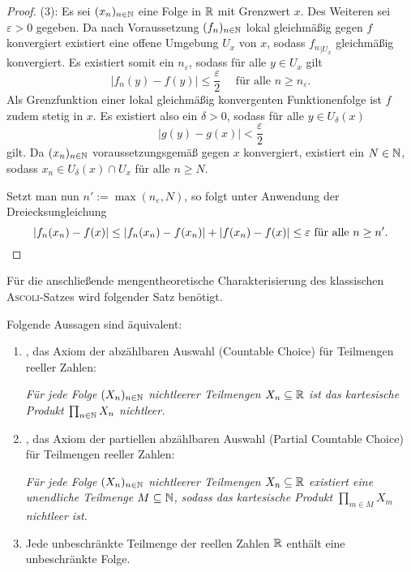 \begin{proof}
  (3): 
  Es sei $(x_n)_{n \in \mathbb{N}}$ eine Folge in $\mathbb{R}$ mit Grenzwert $x$.
  Des Weiteren sei $\varepsilon > 0$ gegeben.
  Da nach Voraussetzung $(f_n)_{n \in \mathbb{N}}$ lokal gleichmäßig gegen $f$ konvergiert existiert eine offene Umgebung $U_x$ von $x$, sodass ${f_n}_{| U_x}$ gleichmäßig konvergiert.
  Es existiert somit ein $n_\varepsilon$, sodass für alle $y \in U_x$ gilt 
  \begin{displaymath}
    | f_n(y) - f(y) | \leq \frac{\varepsilon}{2} \quad \text{ für alle $n \geq n_\varepsilon$}.
  \end{displaymath}
  Als Grenzfunktion einer lokal gleichmäßig konvergenten Funktionenfolge ist $f$ zudem stetig in $x$.
  Es existiert also ein $\delta > 0$, sodass für alle $y \in U_\delta(x)$
  \begin{displaymath}
    | g(y) - g(x) | < \frac{\varepsilon}{2}
  \end{displaymath}
  gilt.
  Da $(x_n)_{n \in \mathbb{N}}$ voraussetzungsgemäß gegen $x$ konvergiert, existiert ein $N \in \mathbb{N}$, sodass $x_n \in U_\delta(x) \cap U_x$ für alle $n \geq N$.

  Setzt man nun $n':= \max(n_\varepsilon, N)$, so folgt unter Anwendung der Dreiecksungleichung
  \begin{displaymath}
    | f_n(x_n) - f(x) |
    \leq
    | f_n(x_n) - f(x_n) | + | f(x_n) - f(x) | 
    \leq \varepsilon \text{ für alle $n \geq n'$}. \qedhere
  \end{displaymath}
\end{proof}

Für die anschließende mengentheoretische Charakterisierung des klassischen \textsc{Ascoli}\hyp{}Satzes wird folgender Satz benötigt.

\begin{thm}
  \label{thm:unboundedsubsetofR}
  Folgende Aussagen sind äquivalent:
  \begin{enumerate}[(1)]
    \item \CCR, das Axiom der abzählbaren Auswahl (Countable Choice) für Teilmengen reeller Zahlen:
      \begin{addmargin}[2em]{2em}%
        \textit{Für jede Folge $(X_n)_{n \in \mathbb{N}}$ nichtleerer Teilmengen $X_n \subseteq \mathbb{R}$ ist das kartesische Produkt $\prod_{n \in \mathbb{N}} X_n$ nichtleer.}
      \end{addmargin}
    \item \PCCR, das Axiom der partiellen abzählbaren Auswahl (Partial Countable Choice) für Teilmengen reeller Zahlen: 
      \begin{addmargin}[2em]{2em}%
        \textit{Für jede Folge $(X_n)_{n \in \mathbb{N}}$ nichtleerer Teilmengen $X_n \subseteq \mathbb{R}$ existiert eine unendliche Teilmenge $M \subseteq \mathbb{N}$, sodass das kartesische Produkt $\prod_{m \in M} X_m$ nichtleer ist.}
      \end{addmargin}
    \item Jede unbeschränkte Teilmenge der reellen Zahlen $\mathbb{R}$ enthält eine unbeschränkte Folge.
  \end{enumerate}
\end{thm}

